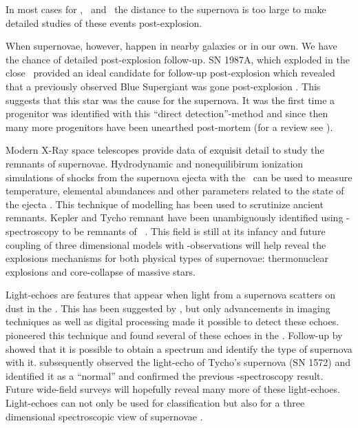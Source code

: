 In most cases for \sneia, \sneibc\ and \sneii\ the distance to the supernova is too large to make detailed studies of these events post-explosion. 

When supernovae, however, happen in nearby galaxies or in our own. We have the chance of detailed post-explosion follow-up.
SN 1987A, which exploded in the close \lmc\, provided an ideal candidate for follow-up post-explosion which revealed that a previously observed Blue Supergiant was gone post-explosion \cite{1989A&A...219..229W}. This suggests that this star was the cause for the supernova. It was the first time a progenitor was identified with this ``direct detection''-method and since then many more progenitors have been unearthed post-mortem (for a review see 
\cite{2009ARA&A..47...63S}).

Modern X-Ray space telescopes provide data of exquisit detail to study the remnants of supernovae. Hydrodynamic and nonequilibirum ionization simulations of shocks from the supernova ejecta with the \ism\ can be used to measure temperature, elemental abundances and other parameters related to the state of the ejecta \citep{2003ApJ...593..358B, 2004AstL...30..737S, 2005ApJ...624..198B}. This technique of modelling has been used to scrutinize ancient remnants. Kepler and Tycho remnant have been unambiguously identified using \xray-spectroscopy to be remnants of \sneia\ \citep{2006ApJ...645.1373B, 2007ApJ...668L.135R}. This field is still at its infancy and future coupling of three dimensional models with \xray-observations will help reveal the explosions mechanisms for both physical types of supernovae: thermonuclear explosions and core-collapse of massive stars. 

Light-echoes are features that appear when light from a supernova scatters on dust in the \ism. This has been suggested by \citet{1940RvMP...12...66Z}, but only advancements in imaging techniques as well as digital processing made it possible to detect these echoes. \cite{2005Natur.438.1132R} pioneered this technique and found several of these echoes in the \lmc. Follow-up by \cite{2008ApJ...680.1137R} showed that it is possible to obtain a spectrum and identify the type of supernova with it. 
\cite{2008Natur.456..617K} subsequently observed the light-echo of Tycho's supernova (SN 1572) and identified it as a ``normal'' \snia and confirmed the previous \xray-spectroscopy result. Future wide-field surveys will hopefully reveal many more of these light-echoes. Light-echoes can not only be used for classification but also for a three dimensional spectroscopic view of supernovae \citep[demonstrated on the example of Cassiopeia A remnant][]{2011ApJ...732....3R}.

